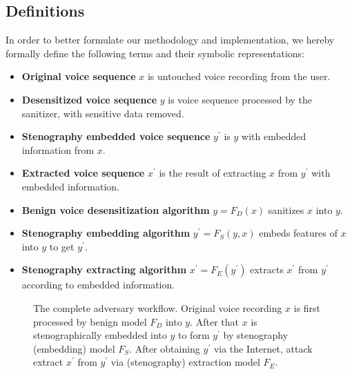 \documentclass[journal]{IEEEtran} %
\begin{document}
\subsection{Definitions}

In order to better formulate our methodology and implementation, we hereby formally define the following terms and their symbolic representations:

\begin{itemize}
    \item \textbf{Original voice sequence} $x$ is untouched voice recording from the user.
    \item \textbf{Desensitized voice sequence} $y$ is voice sequence processed by the sanitizer, with sensitive data removed.
    \item \textbf{Stenography embedded voice sequence} $y^{\prime}$ is $y$ with embedded information from $x$.
    \item \textbf{Extracted voice sequence} $x^{\prime}$ is the result of extracting $x$ from $y^{\prime}$ with embedded information.
    \item \textbf{Benign voice desensitization algorithm} $y = F_D(x)$ sanitizes $x$ into $y$.
    \item \textbf{Stenography embedding algorithm} $y^{\prime} = F_S(y, x)$ embeds features of $x$ into $y$ to get $y^{\prime}$.
    \item \textbf{Stenography extracting algorithm} $x^{\prime} = F_E(y^{\prime})$ extracts $x^{\prime}$ from $y^{\prime}$ according to embedded information.
\end{itemize}

\begin{figure}[!t]
    \caption{The complete adversary workflow. Original voice recording $x$ is first processed by benign model $F_D$ into $y$. After that $x$ is stenographically embedded into $y$ to form $y^{\prime}$ by stenography (embedding) model $F_S$. After obtaining $y^{\prime}$ via the Internet, attack extract $x^{\prime}$ from $y^{\prime}$ via (stenography) extraction model $F_E$.}
    \label{fig:method}
\end{figure}
\end{document}
